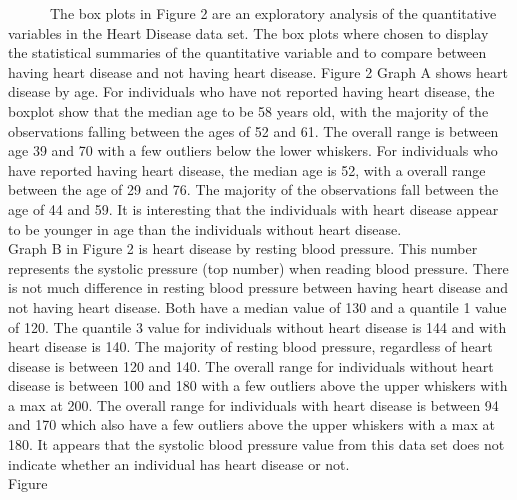 \documentclass[
]{article}
\begin{document}
\newpage

~~~~~~The box plots in Figure 2 are an exploratory analysis of the
quantitative variables in the Heart Disease data set. The box plots
where chosen to display the statistical summaries of the quantitative
variable and to compare between having heart disease and not having
heart disease. Figure 2 Graph A shows heart disease by age. For
individuals who have not reported having heart disease, the boxplot show
that the median age to be 58 years old, with the majority of the
observations falling between the ages of 52 and 61. The overall range is
between age 39 and 70 with a few outliers below the lower whiskers. For
individuals who have reported having heart disease, the median age is
52, with a overall range between the age of 29 and 76. The majority of
the observations fall between the age of 44 and 59. It is interesting
that the individuals with heart disease appear to be younger in age than
the individuals without heart disease.\\
\hspace*{0.333em}\hspace*{0.333em}\hspace*{0.333em}\hspace*{0.333em}\hspace*{0.333em}\hspace*{0.333em}Graph
B in Figure 2 is heart disease by resting blood pressure. This number
represents the systolic pressure (top number) when reading blood
pressure. There is not much difference in resting blood pressure between
having heart disease and not having heart disease. Both have a median
value of 130 and a quantile 1 value of 120. The quantile 3 value for
individuals without heart disease is 144 and with heart disease is 140.
The majority of resting blood pressure, regardless of heart disease is
between 120 and 140. The overall range for individuals without heart
disease is between 100 and 180 with a few outliers above the upper
whiskers with a max at 200. The overall range for individuals with heart
disease is between 94 and 170 which also have a few outliers above the
upper whiskers with a max at 180. It appears that the systolic blood
pressure value from this data set does not indicate whether an
individual has heart disease or not.\\
\hspace*{0.333em}\hspace*{0.333em}\hspace*{0.333em}\hspace*{0.333em}\hspace*{0.333em}\hspace*{0.333em}Figure
\end{document}
